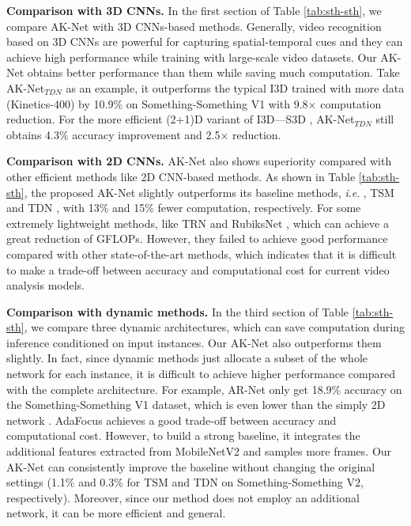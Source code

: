 \documentclass[journal]{IEEEtran}
\newcommand{\ie}{\textit{i}.\textit{e}. }
\begin{document}
\textbf{Comparison with 3D CNNs.}
In the first section of Table \ref{tab:sth-sth}, we compare AK-Net with 3D CNNs-based methods.
Generally, video recognition based on 3D CNNs are powerful for capturing spatial-temporal cues and they can achieve high performance while training with large-scale video datasets.
Our AK-Net obtains better performance than them while saving much computation.
Take AK-Net$_{TDN}$ as an example, it outperforms the typical I3D \cite{carreira2017quo} trained with more data (Kinetics-400) by 10.9\% on Something-Something V1 with 9.8$\times$ computation reduction.
For the more efficient (2+1)D variant of I3D---S3D \cite{xie2018rethinking}, AK-Net$_{TDN}$ still obtains 4.3\% accuracy improvement and 2.5$\times$ reduction.

\textbf{Comparison with 2D CNNs.}
AK-Net also shows superiority compared with other efficient methods like 2D CNN-based methods.
As shown in Table \ref{tab:sth-sth}, the proposed AK-Net slightly outperforms its baseline methods, \ie, TSM \cite{lin2019tsm} and TDN \cite{wang2021tdn}, with 13\% and 15\% fewer computation, respectively.
For some extremely lightweight methods, like TRN \cite{zhou2018temporal} and RubiksNet \cite{fan2020rubiksnet}, which can achieve a great reduction of GFLOPs.
However, they failed to achieve good performance compared with other state-of-the-art methods, which indicates that it is difficult to make a trade-off between accuracy and computational cost for current video analysis models.

\textbf{Comparison with dynamic methods.}
In the third section of Table \ref{tab:sth-sth}, we compare three dynamic architectures, which can save computation during inference conditioned on input instances.
Our AK-Net also outperforms them slightly.
In fact, since dynamic methods just allocate a subset of the whole network for each instance, it is difficult to achieve higher performance compared with the complete architecture.
For example, AR-Net \cite{meng2020ar} only get 18.9\% accuracy on the Something-Something V1 dataset, which is even lower than the simply 2D network \cite{wang2016temporal}.
AdaFocus \cite{Wang_2021_AdaFocus} achieves a good trade-off between accuracy and computational cost.
However, to build a strong baseline, it integrates the additional features extracted from MobileNetV2 \cite{sandler2018mobilenetv2} and samples more frames.
Our AK-Net can consistently improve the baseline without changing the original settings (1.1\% and 0.3\% for TSM and TDN on Something-Something V2, respectively).
Moreover, since our method does not employ an additional network, it can be more efficient and general.
\end{document}
